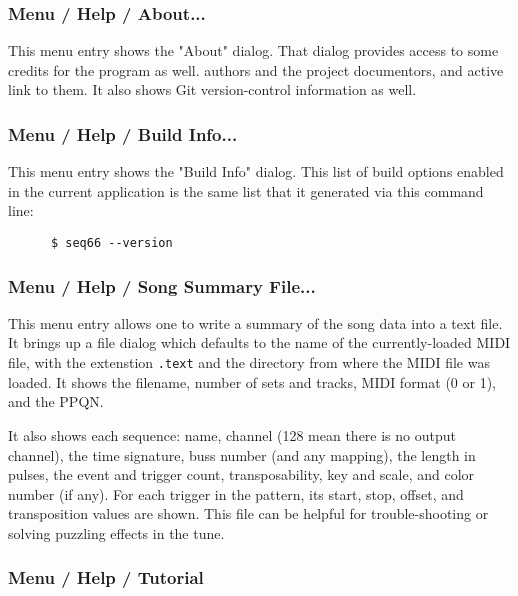 \subsubsection{Menu / Help / About...}
\label{subsubsec:menu_help_about}

   This menu entry shows the "About" dialog.
   That dialog provides access to some credits for the program as well.
   authors and the project documentors, and active link to them.
   It also shows Git version-control information as well.

\subsubsection{Menu / Help / Build Info...}
\label{subsubsec:menu_help_build_info}

   This menu entry shows the "Build Info" dialog.  This list of
   build options enabled in the current application is the same list
   that it generated via this command line:

   \begin{verbatim}
      $ seq66 --version
   \end{verbatim}

\subsubsection{Menu / Help / Song Summary File...}
\label{subsubsec:menu_help_song_summary_file}

   This menu entry allows one to write a summary of the song data into a text
   file. It brings up a file dialog which defaults to the name of the
   currently-loaded MIDI file, with the extenstion \texttt{.text} and
   the directory from where the MIDI file was loaded.
   It shows the filename, number of sets and tracks, MIDI format (0 or 1),
   and the PPQN.

   It also shows each sequence: name, channel (128 mean there is no output
   channel), the time signature, buss number (and any mapping), the length in
   pulses, the event and trigger count, transposability, key and scale, and
   color number (if any).
   For each trigger in the pattern, its start, stop, offset, and transposition
   values are shown.
   This file can be helpful for trouble-shooting or solving puzzling effects in
   the tune.

\subsubsection{Menu / Help / Tutorial}
\label{subsubsec:menu_help_tutorial}

